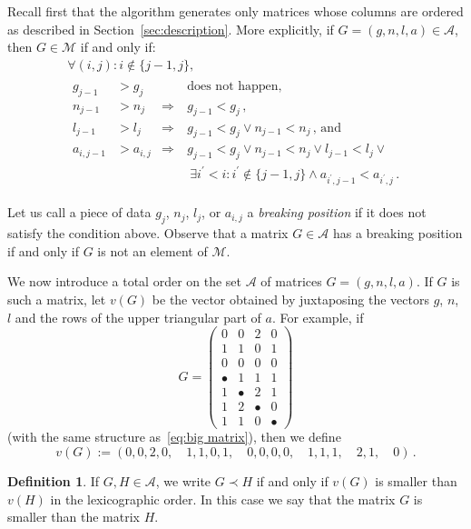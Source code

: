 \documentclass{amsart}
\theoremstyle{plain}
\theoremstyle{definition}
\newtheorem{definition}[theorem]{Definition}
\begin{document}
Recall first that the algorithm generates only matrices whose columns
are ordered as described in Section~\ref{sec:description}. More
explicitly, if $G = (g, n, l, a) \in \mathcal{A}$, then $G \in
\mathcal{M}$ if and only if:
\begin{multline*}
  \forall (i,j)\colon
  i \not\in \{j-1, j\},\\
  \begin{aligned}
    g_{j-1} &> g_j &&\text{does not happen,}\\
    n_{j-1} &> n_j &\Rightarrow\  & g_{j-1} < g_j\,\text{,}\\
    l_{j-1} &> l_j &\Rightarrow\  & g_{j-1} < g_j \vee n_{j-1} < n_j\,\text{, and}\\
    a_{i,j-1} &> a_{i,j} &\Rightarrow\ & g_{j-1} < g_j \vee n_{j-1} < n_j \vee l_{j-1} < l_j \vee\\
    &&&\ \exists i^\prime < i: i^\prime \not\in \{j-1,j\} \wedge a_{i^\prime,j-1} < a_{i^\prime,j}\,\text{.}
  \end{aligned}
\end{multline*}

Let us call a piece of data $g_j$, $n_j$, $l_j$, or $a_{i,j}$ a
\emph{breaking position\/} if it does not satisfy the condition
above. Observe that a matrix $G \in \mathcal{A}$ has a breaking
position if and only if $G$ is not an element of $\mathcal{M}$.

We now introduce a total order on the set $\mathcal{A}$ of matrices $G
= (g,n,l,a)$. If $G$ is such a matrix, let $v(G)$ be the vector
obtained by juxtaposing the vectors $g$, $n$, $l$ and the rows of the
upper triangular part of $a$. For example, if
\[
  G = \begin{pmatrix}
    0 & 0 & 2 & 0\\
    1 & 1 & 0 & 1\\
    0 & 0 & 0 & 0\\
    \hline
    \bullet & 1 & 1 & 1\\
    1 & \bullet & 2 & 1\\
    1 & 2 & \bullet & 0\\
    1 & 1 & 0 & \bullet
  \end{pmatrix}
\]
(with the same structure as~\eqref{eq:big matrix}), then we define
\[
v(G) := (0, 0, 2, 0,\quad 1, 1, 0, 1,\quad 0, 0, 0, 0,\quad 1, 1,
1,\quad 2, 1,\quad 0)\,\text{.}
\]

\begin{definition}\label{def:order}
  If $G, H \in \mathcal{A}$, we write $G \prec H$ if and only if
  $v(G)$ is smaller than $v(H)$ in the lexicographic order.  In this
  case we say that the matrix $G$ is smaller than the matrix $H$.
\end{definition}
\end{document}
